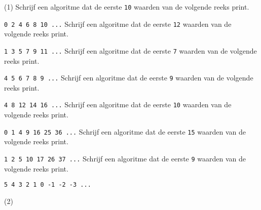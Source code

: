 \begin{exercise}
    \begin{longtasks}(1)
        \task
        Schrijf een algoritme dat de eerste \texttt{10} waarden van de volgende reeks print.
        
        \texttt{0 2 4 6 8 10 ...}
        \task
        Schrijf een algoritme dat de eerste \texttt{12} waarden van de volgende reeks print.

        \texttt{1 3 5 7 9 11 ...}
        \task
        Schrijf een algoritme dat de eerste \texttt{7} waarden van de volgende reeks print.

        \texttt{4 5 6 7 8 9 ...}
        \task
        Schrijf een algoritme dat de eerste \texttt{9} waarden van de volgende reeks print.

        \texttt{4 8 12 14 16 ...}
        \task
        Schrijf een algoritme dat de eerste \texttt{10} waarden van de volgende reeks print.

        \texttt{0 1 4 9 16 25 36 ...}
        \task
        Schrijf een algoritme dat de eerste \texttt{15} waarden van de volgende reeks print.

        \texttt{1 2 5 10 17 26 37 ...}
        \task
        Schrijf een algoritme dat de eerste \texttt{9} waarden van de volgende reeks print.

        \texttt{5 4 3 2 1 0 -1 -2 -3 ...}
    \end{longtasks}
\end{exercise}

\begin{solution}
    \begin{mltasks}(2)
        \task {}
        \task {}
        \task {}
        \task {}
        \task {}
        \task {}
        \task {}
    \end{mltasks}
\end{solution}

